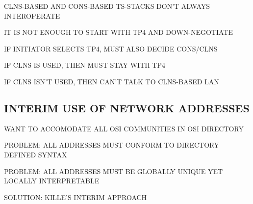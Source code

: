 \begin{bwslide}

\begin{nrtc}
\item	CLNS-BASED AND CONS-BASED TS-STACKS DON'T ALWAYS INTEROPERATE
    \begin{nrtc}
    \item	IT IS NOT ENOUGH TO START WITH TP4 AND DOWN-NEGOTIATE
    \end{nrtc}
\end{nrtc}

\end{bwslide}


\begin{bwslide}

\begin{nrtc}
\item	IF INITIATOR SELECTS TP4, MUST ALSO DECIDE CONS/CLNS
    \begin{nrtc}
    \item	IF CLNS IS USED, THEN MUST STAY WITH TP4

    \item	IF CLNS ISN'T USED, THEN CAN'T TALK TO CLNS-BASED LAN    
    \end{nrtc}
\end{nrtc}
\end{bwslide}


\begin{bwslide}
\part*	{INTERIM USE OF NETWORK ADDRESSES}\bf

\begin{nrtc}
\item	WANT TO ACCOMODATE ALL OSI COMMUNITIES IN OSI DIRECTORY

\item	PROBLEM: ALL ADDRESSES MUST CONFORM TO DIRECTORY DEFINED SYNTAX

\item	PROBLEM: ALL ADDRESSES MUST BE GLOBALLY UNIQUE YET LOCALLY
	INTERPRETABLE

\item	SOLUTION: KILLE'S INTERIM APPROACH
\end{nrtc}
\end{bwslide}


